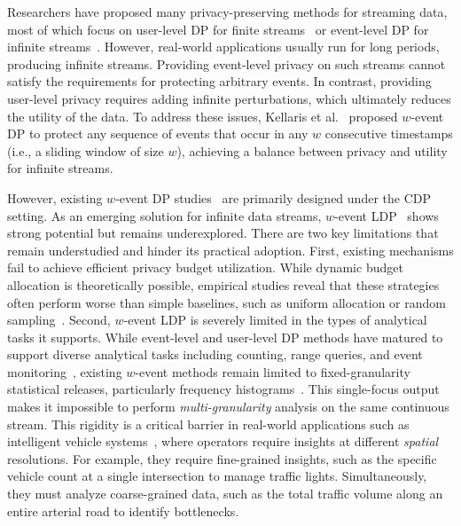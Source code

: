 \documentclass[acmsmall]{acmart}
\begin{document}
Researchers have proposed many privacy-preserving methods for streaming data,
most of which focus on user-level DP for finite streams~\cite{Fan2013a,
  Fan2013, Fan2012} or event-level DP for infinite streams~\cite{Dwork2010,
  Bolot2013}.
However, real-world applications usually run for long periods, producing
infinite streams.
Providing event-level privacy on such streams cannot satisfy the requirements for
protecting arbitrary events.
In contrast, providing user-level privacy requires adding infinite
perturbations, which ultimately reduces the utility of the data.
To address these issues, Kellaris et al.~\cite{Kellaris2014} proposed $w$-event
DP to protect any sequence of events that occur in any $w$ consecutive
timestamps (i.e., a sliding window of size $w$), achieving a balance between
privacy and utility for infinite streams.

However, existing $w$-event DP studies~\cite{Ren2020,Wang2020,Wang2019,Wang2016}
are primarily designed under the CDP setting.
As an emerging solution for infinite data streams, $w$-event LDP~\cite{Ren2022}
shows strong potential but remains underexplored.
There are two key limitations that remain understudied and hinder its practical
adoption.
First, existing mechanisms fail to achieve efficient privacy budget utilization.
While dynamic budget allocation is theoretically possible, empirical studies
reveal that these strategies often perform worse than simple baselines, such as
uniform allocation or random sampling~\cite{Schaler2024}.
Second, $w$-event LDP is severely limited in the types of analytical tasks it
supports.
While event-level and user-level DP methods have matured to support diverse
analytical tasks including counting, range queries, and event
monitoring~\cite{Chen2017, Cao2017, Chan2012}, existing $w$-event methods remain
limited to fixed-granularity statistical releases, particularly frequency
histograms~\cite{Ren2022,Li2025}.
This single-focus output makes it impossible to perform \emph{multi-granularity}
analysis on the same continuous stream.
This rigidity is a critical barrier in real-world applications such as
intelligent vehicle systems~\cite{sharif2017internet},
where operators require
insights at different \emph{spatial} resolutions.
For example, they require fine-grained insights, such as the specific vehicle
count at a single intersection to manage traffic lights.
Simultaneously, they must analyze coarse-grained data, such as the total traffic
volume along an entire arterial road to identify bottlenecks.
\end{document}
